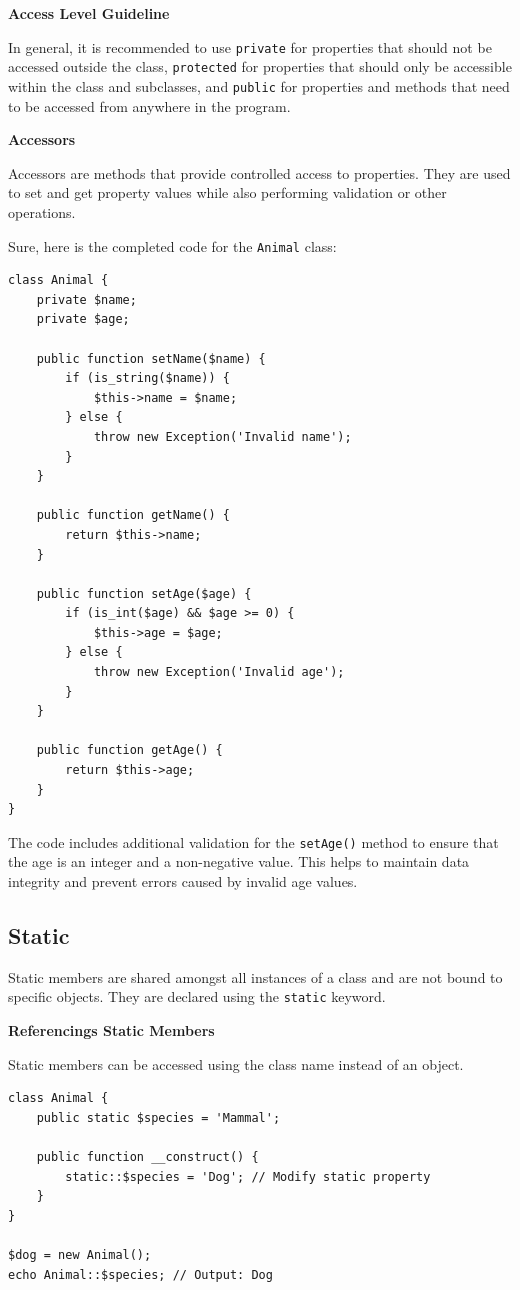 \documentclass[11pt]{article}
\begin{document}
\textbf{Access Level Guideline}

In general, it is recommended to use \texttt{private} for properties that
should not be accessed outside the class, \texttt{protected} for properties
that should only be accessible within the class and subclasses, and
\texttt{public} for properties and methods that need to be accessed from
anywhere in the program.

\textbf{Accessors}

Accessors are methods that provide controlled access to properties. They
are used to set and get property values while also performing validation
or other operations.

Sure, here is the completed code for the \texttt{Animal} class:

\begin{verbatim}
class Animal {
    private $name;
    private $age;

    public function setName($name) {
        if (is_string($name)) {
            $this->name = $name;
        } else {
            throw new Exception('Invalid name');
        }
    }

    public function getName() {
        return $this->name;
    }

    public function setAge($age) {
        if (is_int($age) && $age >= 0) {
            $this->age = $age;
        } else {
            throw new Exception('Invalid age');
        }
    }

    public function getAge() {
        return $this->age;
    }
}
\end{verbatim}

The code includes additional validation for the \texttt{setAge()} method to
ensure that the age is an integer and a non-negative value. This helps
to maintain data integrity and prevent errors caused by invalid age
values.

\subsection{\textbf{Static}}
\label{sec:org3168627}
Static members are shared amongst all instances of a class and are not
bound to specific objects. They are declared using the \texttt{static} keyword.

\textbf{Referencings Static Members}

Static members can be accessed using the class name instead of an
object.

\begin{verbatim}
class Animal {
    public static $species = 'Mammal';

    public function __construct() {
        static::$species = 'Dog'; // Modify static property
    }
}

$dog = new Animal();
echo Animal::$species; // Output: Dog
\end{verbatim}
\end{document}
